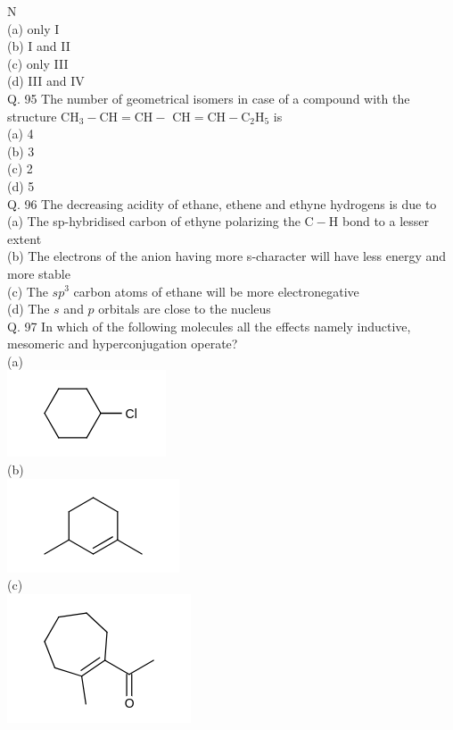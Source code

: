 \documentclass[10pt]{article}
\begin{document}
N\\
(a) only I\\
(b) I and II\\
(c) only III\\
(d) III and IV\\
Q. 95 The number of geometrical isomers in case of a compound with the structure $\mathrm{CH}_{3}-\mathrm{CH}=\mathrm{CH}-$ $\mathrm{CH}=\mathrm{CH}-\mathrm{C}_{2} \mathrm{H}_{5}$ is\\
(a) 4\\
(b) 3\\
(c) 2\\
(d) 5\\
Q. 96 The decreasing acidity of ethane, ethene and ethyne hydrogens is due to\\
(a) The sp-hybridised carbon of ethyne polarizing the $\mathrm{C}-\mathrm{H}$ bond to a lesser extent\\
(b) The electrons of the anion having more s-character will have less energy and more stable\\
(c) The $s p^{3}$ carbon atoms of ethane will be more electronegative\\
(d) The $s$ and $p$ orbitals are close to the nucleus\\
Q. 97 In which of the following molecules all the effects namely inductive, mesomeric and hyperconjugation operate?\\
(a)\\
\includegraphics{smile-1c841ecbcca605f3f8a9266df4a20bd62011c71e}\\
(b)\\
\includegraphics{smile-b500ebb27d425bb5a4d191371dc94f9927a328c7}\\
(c)\\
\includegraphics{smile-31b3cd9345fbac160679fade52ea98e1d70a5f17}\\
\end{document}
